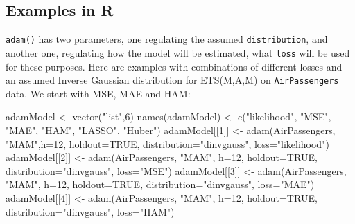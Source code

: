 \documentclass[
]{book}
\newenvironment{Shaded}{\begin{snugshade}}{\end{snugshade}}
\newcommand{\AttributeTok}[1]{\textcolor[rgb]{0.77,0.63,0.00}{#1}}
\newcommand{\ConstantTok}[1]{\textcolor[rgb]{0.00,0.00,0.00}{#1}}
\newcommand{\DecValTok}[1]{\textcolor[rgb]{0.00,0.00,0.81}{#1}}
\newcommand{\FunctionTok}[1]{\textcolor[rgb]{0.00,0.00,0.00}{#1}}
\newcommand{\NormalTok}[1]{#1}
\newcommand{\OtherTok}[1]{\textcolor[rgb]{0.56,0.35,0.01}{#1}}
\newcommand{\StringTok}[1]{\textcolor[rgb]{0.31,0.60,0.02}{#1}}
\theoremstyle{definition}
\theoremstyle{definition}
\theoremstyle{definition}
\theoremstyle{definition}
\theoremstyle{remark}
\begin{document}
\hypertarget{examples-in-r}{%
\subsection{Examples in R}\label{examples-in-r}}

\texttt{adam()} has two parameters, one regulating the assumed \texttt{distribution}, and another one, regulating how the model will be estimated, what \texttt{loss} will be used for these purposes. Here are examples with combinations of different losses and an assumed Inverse Gaussian distribution for ETS(M,A,M) on \texttt{AirPassengers} data. We start with MSE, MAE and HAM:

\begin{Shaded}
\begin{Highlighting}[]
\NormalTok{adamModel }\OtherTok{\textless{}{-}} \FunctionTok{vector}\NormalTok{(}\StringTok{"list"}\NormalTok{,}\DecValTok{6}\NormalTok{)}
\FunctionTok{names}\NormalTok{(adamModel) }\OtherTok{\textless{}{-}}
    \FunctionTok{c}\NormalTok{(}\StringTok{"likelihood"}\NormalTok{, }\StringTok{"MSE"}\NormalTok{, }\StringTok{"MAE"}\NormalTok{, }\StringTok{"HAM"}\NormalTok{, }\StringTok{"LASSO"}\NormalTok{, }\StringTok{"Huber"}\NormalTok{)}
\NormalTok{adamModel[[}\DecValTok{1}\NormalTok{]] }\OtherTok{\textless{}{-}} \FunctionTok{adam}\NormalTok{(AirPassengers, }\StringTok{"MAM"}\NormalTok{,}\AttributeTok{h=}\DecValTok{12}\NormalTok{, }\AttributeTok{holdout=}\ConstantTok{TRUE}\NormalTok{,}
                       \AttributeTok{distribution=}\StringTok{"dinvgauss"}\NormalTok{,}
                       \AttributeTok{loss=}\StringTok{"likelihood"}\NormalTok{)}
\NormalTok{adamModel[[}\DecValTok{2}\NormalTok{]] }\OtherTok{\textless{}{-}} \FunctionTok{adam}\NormalTok{(AirPassengers, }\StringTok{"MAM"}\NormalTok{, }\AttributeTok{h=}\DecValTok{12}\NormalTok{, }\AttributeTok{holdout=}\ConstantTok{TRUE}\NormalTok{,}
                       \AttributeTok{distribution=}\StringTok{"dinvgauss"}\NormalTok{,}
                       \AttributeTok{loss=}\StringTok{"MSE"}\NormalTok{)}
\NormalTok{adamModel[[}\DecValTok{3}\NormalTok{]] }\OtherTok{\textless{}{-}} \FunctionTok{adam}\NormalTok{(AirPassengers, }\StringTok{"MAM"}\NormalTok{, }\AttributeTok{h=}\DecValTok{12}\NormalTok{, }\AttributeTok{holdout=}\ConstantTok{TRUE}\NormalTok{,}
                       \AttributeTok{distribution=}\StringTok{"dinvgauss"}\NormalTok{,}
                       \AttributeTok{loss=}\StringTok{"MAE"}\NormalTok{)}
\NormalTok{adamModel[[}\DecValTok{4}\NormalTok{]] }\OtherTok{\textless{}{-}} \FunctionTok{adam}\NormalTok{(AirPassengers, }\StringTok{"MAM"}\NormalTok{, }\AttributeTok{h=}\DecValTok{12}\NormalTok{, }\AttributeTok{holdout=}\ConstantTok{TRUE}\NormalTok{,}
                       \AttributeTok{distribution=}\StringTok{"dinvgauss"}\NormalTok{,}
                       \AttributeTok{loss=}\StringTok{"HAM"}\NormalTok{)}
\end{Highlighting}
\end{Shaded}
\end{document}
